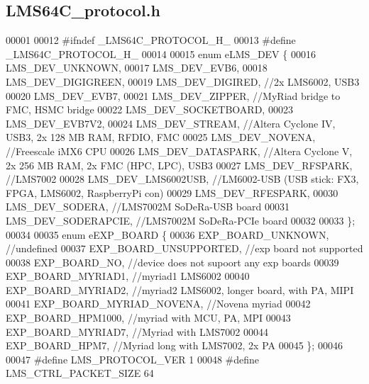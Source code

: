 \subsection{L\+M\+S64\+C\+\_\+protocol.\+h}
\label{LMS64C__protocol_8h_source}

\begin{DoxyCode}
00001 
00012 \textcolor{preprocessor}{#ifndef \_LMS64C\_PROTOCOL\_H\_}
00013 \textcolor{preprocessor}{#define \_LMS64C\_PROTOCOL\_H\_}
00014 
00015 \textcolor{keyword}{enum} eLMS_DEV \{
00016     LMS_DEV_UNKNOWN, 
00017     LMS_DEV_EVB6,
00018     LMS_DEV_DIGIGREEN, 
00019     LMS_DEV_DIGIRED, \textcolor{comment}{//2x LMS6002, USB3}
00020     LMS_DEV_EVB7, 
00021     LMS_DEV_ZIPPER, \textcolor{comment}{//MyRiad bridge to FMC, HSMC bridge}
00022     LMS_DEV_SOCKETBOARD, 
00023     LMS_DEV_EVB7V2, 
00024     LMS_DEV_STREAM, \textcolor{comment}{//Altera Cyclone IV, USB3, 2x 128 MB RAM, RFDIO, FMC}
00025     LMS_DEV_NOVENA, \textcolor{comment}{//Freescale iMX6 CPU}
00026     LMS_DEV_DATASPARK, \textcolor{comment}{//Altera Cyclone V, 2x 256 MB RAM, 2x FMC (HPC, LPC), USB3}
00027     LMS_DEV_RFSPARK, \textcolor{comment}{//LMS7002}
00028     LMS_DEV_LMS6002USB, \textcolor{comment}{//LM6002-USB (USB stick: FX3, FPGA, LMS6002, RaspberryPi con)}
00029     LMS_DEV_RFESPARK,
00030     LMS_DEV_SODERA,     \textcolor{comment}{//LMS7002M SoDeRa-USB board}
00031     LMS_DEV_SODERAPCIE, \textcolor{comment}{//LMS7002M SoDeRa-PCIe board}
00032 
00033     \};
00034 
00035 \textcolor{keyword}{enum} eEXP_BOARD \{
00036     EXP_BOARD_UNKNOWN, \textcolor{comment}{//undefined}
00037     EXP_BOARD_UNSUPPORTED, \textcolor{comment}{//exp board not supported}
00038     EXP_BOARD_NO, \textcolor{comment}{//device does not supoort any exp boards}
00039     EXP_BOARD_MYRIAD1, \textcolor{comment}{//myriad1 LMS6002}
00040     EXP_BOARD_MYRIAD2, \textcolor{comment}{//myriad2 LMS6002, longer board, with PA, MIPI}
00041     EXP_BOARD_MYRIAD_NOVENA, \textcolor{comment}{//Novena myriad}
00042     EXP_BOARD_HPM1000, \textcolor{comment}{//myriad with MCU, PA, MPI}
00043     EXP_BOARD_MYRIAD7, \textcolor{comment}{//Myriad with LMS7002}
00044     EXP_BOARD_HPM7, \textcolor{comment}{//Myriad long with LMS7002, 2x PA}
00045     \};
00046 
00047 \textcolor{preprocessor}{#define LMS\_PROTOCOL\_VER        1}
00048 \textcolor{preprocessor}{#define LMS\_CTRL\_PACKET\_SIZE    64}

\end{DoxyCode}

